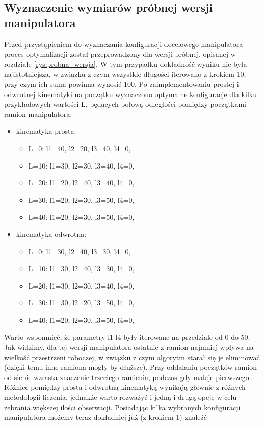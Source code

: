 \documentclass[printmode]{mgr}
\begin{document}
\subsection{Wyznaczenie wymiarów próbnej wersji manipulatora}
Przed przystąpieniem do wyznaczania konfiguracji docelowego manipulatora proces optymalizacji został przeprowadzony dla wersji próbnej,
opisanej w rozdziale \ref{rys:probna_wersja}. W tym przypadku dokładność wyniku nie była najistotniejsza, w związku z czym
wszystkie długości iterowano z krokiem 10, przy czym ich suma powinna wynosić 100. 
Po zaimplementowaniu prostej i odwrotnej kinematyki na początku wyznaczono optymalne
konfiguracje dla kilku przykładowych wartości L, będących połową odległości pomiędzy początkami ramion manipulatora:
\begin{itemize}
\item kinematyka prosta:
\begin{itemize}
\item L=0: l1=40, l2=20, l3=40, l4=0,
\item L=10: l1=30, l2=30, l3=40, l4=0,
\item L=20: l1=20, l2=40, l3=40, l4=0,
\item L=30: l1=20, l2=30, l3=50, l4=0,
\item L=40: l1=20, l2=30, l3=50, l4=0,
\end{itemize}
\item kinematyka odwrotna:
\begin{itemize}
\item L=0: l1=30, l2=40, l3=30, l4=0,
\item L=10: l1=30, l2=40, l3=30, l4=0,
\item L=20: l1=30, l2=30, l3=40, l4=0,
\item L=30: l1=30, l2=20, l3=50, l4=0,
\item L=40: l1=20, l2=30, l3=50, l4=0,
\end{itemize}
\end{itemize}
Warto wspomnieć, że parametry l1-l4 były iterowane na przedziale od 0 do 50. Jak widzimy, dla tej wersji manipulatora ostatnie z ramion
najmniej wpływa na wielkość przestrzeni roboczej, w związku z czym algorytm starał się je eliminować (dzięki temu inne ramiona mogły by dłuższe).
Przy oddalaniu początków ramion od siebie wzrasta znaczenie trzeciego ramienia, podczas gdy maleje pierwszego. Różnice pomiędzy prostą
i odwrotną kinematyką wynikają głównie z różnych metodologii liczenia, jednakże warto rozważyć i jedną i drugą opcję w celu zebrania
większej ilości obserwacji. Posiadając kilka wybranych konfiguracji manipulatora możemy teraz dokładniej już (z krokiem 1) znaleźć
\end{document}
